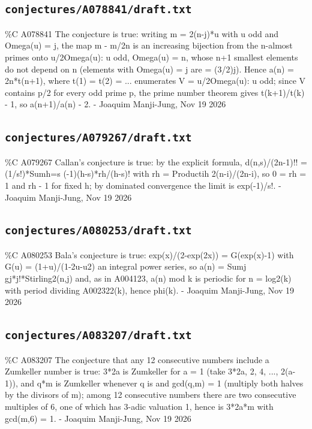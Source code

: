 \subsection*{\texttt{conjectures/A078841/draft.txt}}
{\small\raggedright\ttfamily
\%C A078841 The conjecture is true: writing m = 2(n-j)*u with u odd and Omega(u) = j, the map m - m/2n is an increasing bijection from the n-almost primes onto u/2Omega(u): u odd, Omega(u) = n, whose n+1 smallest elements do not depend on n (elements with Omega(u) = j are = (3/2)j). Hence a(n) = 2n*t(n+1), where t(1) = t(2) = ... enumerates V = u/2Omega(u): u odd; since V contains p/2 for every odd prime p, the prime number theorem gives t(k+1)/t(k) - 1, so a(n+1)/a(n) - 2. - Joaquim Manji-Jung, Nov 19 2026\par
}
\subsection*{\texttt{conjectures/A079267/draft.txt}}
{\small\raggedright\ttfamily
\%C A079267 Callan's conjecture is true: by the explicit formula, d(n,s)/(2n-1)!! = (1/s!)*Sumh=s (-1)(h-s)*rh/(h-s)! with rh = Productih 2(n-i)/(2n-i), so 0 = rh = 1 and rh - 1 for fixed h; by dominated convergence the limit is exp(-1)/s!. - Joaquim Manji-Jung, Nov 19 2026\par
}
\subsection*{\texttt{conjectures/A080253/draft.txt}}
{\small\raggedright\ttfamily
\%C A080253 Bala's conjecture is true: exp(x)/(2-exp(2x)) = G(exp(x)-1) with G(u) = (1+u)/(1-2u-u2) an integral power series, so a(n) = Sumj gj*j!*Stirling2(n,j) and, as in A004123, a(n) mod k is periodic for n = log2(k) with period dividing A002322(k), hence phi(k). - Joaquim Manji-Jung, Nov 19 2026\par
}
\subsection*{\texttt{conjectures/A083207/draft.txt}}
{\small\raggedright\ttfamily
\%C A083207 The conjecture that any 12 consecutive numbers include a Zumkeller number is true: 3*2a is Zumkeller for a = 1 (take 3*2a, 2, 4, ..., 2(a-1)), and q*m is Zumkeller whenever q is and gcd(q,m) = 1 (multiply both halves by the divisors of m); among 12 consecutive numbers there are two consecutive multiples of 6, one of which has 3-adic valuation 1, hence is 3*2a*m with gcd(m,6) = 1. - Joaquim Manji-Jung, Nov 19 2026\par
}
